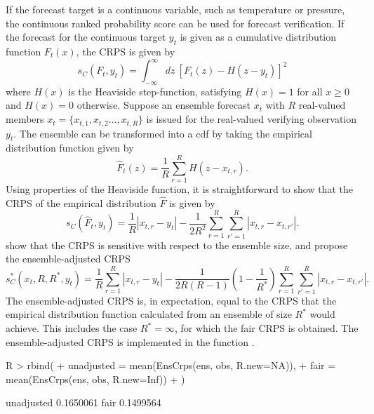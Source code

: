 \documentclass[article]{jss}
\begin{document}
If the forecast target is a continuous variable, such as temperature or pressure, the continuous ranked probability score \citep{matheson1976scoring} can be used for forecast verification.
If the forecast for the continuous target $y_t$ is given as a cumulative distribution function $F_t(x)$, the CRPS is given by 
%
\begin{equation}
s_{C}(F_t, y_t) = \int_{-\infty}^\infty dz\ \left[F_t(z) - H(z-y_t)\right]^2
\end{equation}
%
where $H(x)$ is the Heaviside step-function, satisfying $H(x)=1$ for all $x\ge 0$ and $H(x)=0$ otherwise.
Suppose an ensemble forecast $x_t$ with $R$ real-valued members $x_t = \{x_{t,1}, x_{t,2} \dots, x_{t,R}\}$ is issued for the real-valued verifying observation $y_t$.
The ensemble can be transformed into a cdf by taking the empirical distribution function given by 
%
\begin{equation}
\hat{F}_t(z) = \frac{1}{R} \sum_{r=1}^{R} H(z - x_{t,r}).
\end{equation}
%
Using properties of the Heaviside function, it is straightforward to show that the CRPS of the empirical distribution $\hat{F}$ is given by
%
\begin{equation}
s_{C}(\hat{F}_t, y_t) = \frac{1}{R}|x_{t,r}-y_t| - \frac{1}{2R^2} \sum_{r=1}^R \sum_{r'=1}^R |x_{t,r}-x_{t,r'}|.
\end{equation}
%
\citet{fricker2013three} show that the CRPS is sensitive with respect to the ensemble size, and propose the ensemble-adjusted CRPS
%
\begin{equation}
s_{C}^*(x_t, R, R^*, y_t) = \frac{1}{R}\sum_{r=1}^R |x_{t,r} - y_t| - \frac{1}{2R(R-1)}\left(1-\frac{1}{R^*}\right) \sum_{r=1}^R\sum_{r'=1}^R |x_{t,r}-x_{t,r'}|.
\end{equation}
%
The ensemble-adjusted CRPS is, in expectation, equal to the CRPS that the empirical distribution function calculated from an ensemble of size $R^*$ would achieve.
This includes the case $R^*=\infty$, for which the fair CRPS is obtained.
The ensemble-adjusted CRPS is implemented in the  function .

\begin{Schunk}
\begin{Sinput}
R > rbind(
+   unadjusted = mean(EnsCrps(ens, obs, R.new=NA)), 
+   fair       = mean(EnsCrps(ens, obs, R.new=Inf))
+ )
\end{Sinput}
\begin{Soutput}
                [,1]
unadjusted 0.1650061
fair       0.1499564
\end{Soutput}
\end{Schunk}
\end{document}
